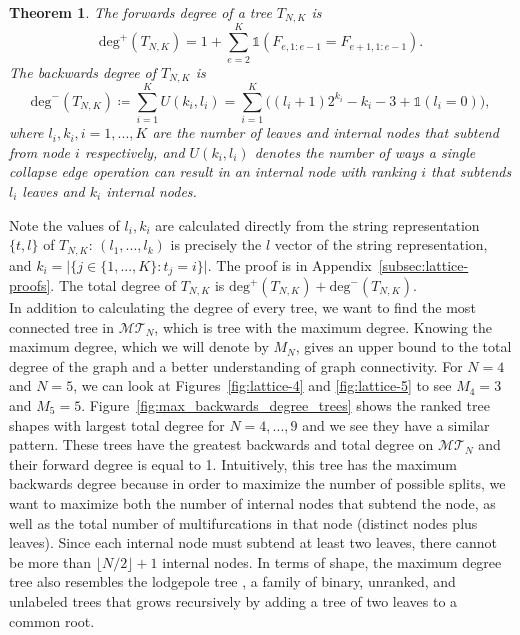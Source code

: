 \documentclass{article}
\newtheorem{theorem}{Theorem}
\begin{document}
\begin{theorem}\label{thm:tree-deg}
The forwards degree of a tree $T_{N,K}$ is \[  \text{deg}^+(T_{N,K}) = 1 + \sum_{e=2}^{K} \mathds{1}(F_{e, 1:e-1} = F_{e+1, 1:e-1} ). \]
The backwards degree of $T_{N,K}$ is \[ \text{deg}^-(T_{N,K}) \coloneq \sum_{i=1}^K U(k_i, l_i) = \sum_{i=1}^K \Big ((l_i+1)2^{k_i} -k_i-3 + \mathds{1}(l_i=0) \Big ), \] where $l_i, k_i, i=1,...,K$ are the number of leaves and internal nodes that subtend from node $i$ respectively, and $U(k_i, l_i)$ denotes the number of ways a single collapse edge operation can result in an internal node with ranking $i$ that subtends $l_i$ leaves and $k_i$ internal nodes.
\end{theorem}

Note the values of $l_i,k_i$ are calculated directly from the string representation $\{t,l\}$ of $T_{N,K}$: $(l_1,...,l_k)$ is precisely the $l$ vector of the string representation, and $k_i = \big |\{j \in \{1,...,K\}: t_j=i\} \big |$. The proof is in Appendix~\ref{subsec:lattice-proofs}. The total degree of $T_{N,K}$ is $\text{deg}^+(T_{N,K}) + \text{deg}^-(T_{N,K})$. \\

In addition to calculating the degree of every tree, we want to find the most connected tree in $\mathcal{MT}_N$, which is tree with the maximum degree. Knowing the maximum degree, which we will denote by $M_N$, gives an upper bound to the total degree of the graph and a better understanding of graph connectivity. For $N=4$ and $N=5$, we can look at Figures~\ref{fig:lattice-4} and \ref{fig:lattice-5} to see $M_4=3$ and $M_5=5$. Figure~\ref{fig:max_backwards_degree_trees} shows the ranked tree shapes with largest total degree for $N=4,...,9$ and we see they have a similar pattern. These trees have the greatest backwards and total degree on $\mathcal{MT}_N$ and their forward degree is equal to 1. Intuitively, this tree has the maximum backwards degree because in order to maximize the number of possible splits, we want to maximize both the number of internal nodes that subtend the node, as well as the total number of multifurcations in that node (distinct nodes plus leaves). Since each internal node must subtend at least two leaves, there cannot be more than $\lfloor N/2 \rfloor + 1$ internal nodes. In terms of shape, the maximum degree tree also resembles the lodgepole tree \citep{disanto2015coalescent}, a family of binary, unranked, and unlabeled trees that grows recursively by adding a tree of two leaves to a common root. 
\end{document}
